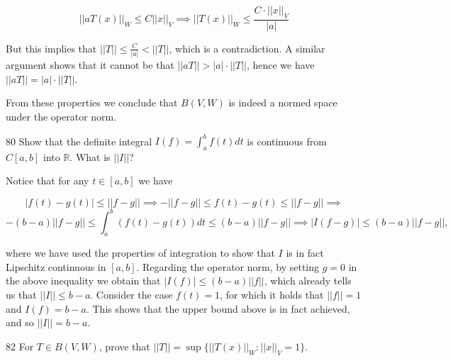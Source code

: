 \begin{solution}
\begin{itemize}
        \[\lvert \lvert a T(x) \rvert \rvert_W \leq C \lvert \lvert x \rvert \rvert_V \implies \lvert \lvert T(x) \rvert \rvert_W \leq \frac{C \cdot \lvert \lvert x \rvert \rvert_V}{\lvert a \rvert} \]

        But this implies that $\lvert \lvert T \rvert \rvert \leq \frac{C}{\lvert a \rvert} < \lvert \lvert T \rvert \rvert$, which is a contradiction.
        A similar argument shows that it cannot be that $\lvert \lvert a T \rvert \rvert > \lvert a \rvert \cdot \lvert \lvert T \rvert \rvert$, hence we have $\lvert \lvert a T \rvert \rvert = \lvert a \rvert \cdot \lvert \lvert T \rvert \rvert$.
    \end{itemize}
    From these properties we conclude that $B(V, W)$ is indeed a normed space under the operator norm.
\end{solution}

\begin{exercise}{80}
    Show that the definite integral $I(f) = \int_{a}^{b} f(t) dt$ is continuous from $C[a, b]$ into $\mathbb{R}$.
    What is $\lvert \lvert I \rvert \rvert$?
\end{exercise}

\begin{solution}
    
    Notice that for any $t \in [a, b]$ we have

    \[\lvert f(t) - g(t) \rvert \leq \lvert \lvert f - g \rvert \rvert \implies - \lvert \lvert f - g \rvert \rvert \leq f(t) - g(t) \leq \lvert \lvert f - g \rvert \rvert \implies \]
    \[-(b - a) \lvert \lvert f - g \rvert \rvert \leq \int_{a}^{b} (f(t) - g(t)) dt \leq (b - a) \lvert \lvert f - g \rvert \rvert \implies \lvert I(f -g) \rvert \leq (b - a) \lvert \lvert f - g \rvert \rvert, \]

    where we have used the properties of integration to show that $I$ is in fact Lipschitz continuous in $[a, b]$.
    Regarding the operator norm, by setting $g = 0$ in the above inequality we obtain that $\lvert I(f) \rvert \leq (b - a) \lvert \lvert f \rvert \rvert$, which already tells us that $\lvert \lvert I \rvert \rvert \leq b - a$.
    Consider the case $f(t) = 1$, for which it holds that $\lvert \lvert f \rvert \rvert = 1$ and $I(f) = b - a$.
    This shows that the upper bound above is in fact achieved, and so $\lvert \lvert I \rvert \rvert = b - a$.
\end{solution}

\begin{exercise}{82}
    For $T \in B(V, W)$, prove that $\lvert \lvert T \rvert \rvert = \sup\{\lvert \lvert T(x) \rvert \rvert_W : \lvert \lvert x \rvert \rvert_V = 1\}$.
\end{exercise}


